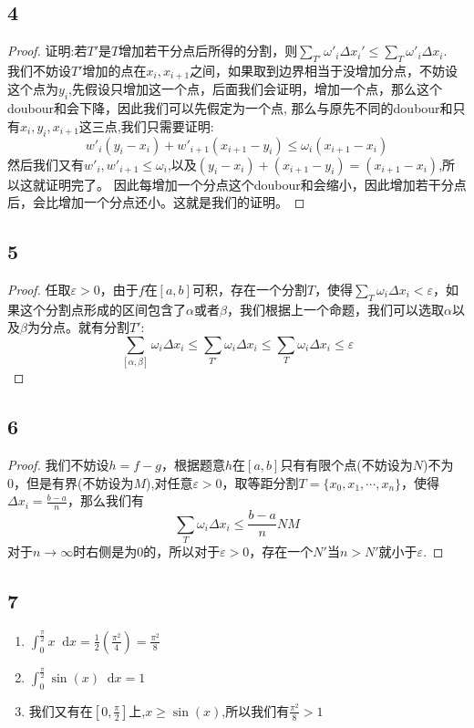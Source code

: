 \documentclass{article}
\newcommand{\dif}{\mathop{}\!\mathrm{d}}
\begin{document}
\subsection{4}
\begin{proof}
证明:若$T'$是$T$增加若干分点后所得的分割，则$\sum_{T'}\omega'_i\Delta x_i'\le\sum_T\omega'_i\Delta x_i$.\\
我们不妨设$T'$增加的点在$x_i,x_{i+1}$之间，如果取到边界相当于没增加分点，不妨设这个点为$y_i$,先假设只增加这一个点，后面我们会证明，增加一个点，那么这个doubour和会下降，因此我们可以先假定为一个点,
那么与原先不同的doubour和只有$x_i,y_i,x_{i+1}$这三点,我们只需要证明:\[
w'_i(y_i-x_i)+w'_{i+1}(x_{i+1}-y_i)\le \omega_i(x_{i+1}-x_i)\]
然后我们又有$w'_i,w'_{i+1}\le \omega_i$,以及$(y_i-x_i)+(x_{i+1}-y_i)=(x_{i+1}-x_i)$,所以这就证明完了。
因此每增加一个分点这个doubour和会缩小，因此增加若干分点后，会比增加一个分点还小。这就是我们的证明。
\end{proof}
\subsection{5}
\begin{proof}
任取$\varepsilon>0$，由于$f$在$[a,b]$可积，存在一个分割$T$，使得$\sum_T\omega_i\Delta x_i<\varepsilon$，如果这个分割点形成的区间包含了$\alpha$或者$\beta$，我们根据上一个命题，我们可以选取$\alpha$以及$\beta$为分点。就有分割$T'$:\[
\sum_{[\alpha,\beta]}\omega_i\Delta x_i\le\sum_{T'}\omega_i\Delta x_i\le\sum_{T}\omega_i\Delta x_i\le \varepsilon\]
\end{proof}
\subsection{6}
\begin{proof}
我们不妨设$h=f-g$，根据题意$h$在$[a,b]$只有有限个点(不妨设为$N$)不为0，但是有界(不妨设为$M$),对任意$\varepsilon>0$，取等距分割$T=\{x_0,x_1,\cdots,x_n\}$，使得$\Delta x_i=\frac{b-a}{n}$，那么我们有\[
\sum_T\omega_i\Delta x_i\le\frac{b-a}{n}NM\]
对于$n\to\infty$时右侧是为$0$的，所以对于$\varepsilon>0$，存在一个$N'$当$n>N'$就小于$\varepsilon$.
\end{proof}
\subsection{7}
\begin{enumerate}
\item $\int_0^{\frac\pi2}x\dif x=\frac12(\frac{\pi^2}{4})=\frac{\pi^2}{8}$
\item $\int_0^{\frac\pi2}\sin(x)\dif x=1$
\item 我们又有在$[0,\frac\pi2]$上,$x\ge\sin(x)$,所以我们有$\frac{\pi^2}{8}>1$
\end{enumerate}
\end{document}
